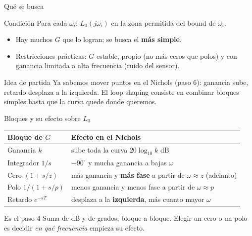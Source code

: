 \documentclass[aspectratio=169,11pt]{beamer}
\begin{document}
\begin{frame}{Qué se busca}
  \small
  \begin{block}{Condición}
    Para cada $\omega_i$: $L_0(j\omega_i)$ en la zona permitida del bound de $\omega_i$.
  \end{block}
  \begin{itemize}
    \item Hay muchos $G$ que lo logran; se busca el \textbf{más simple}.
    \item Restricciones prácticas: $G$ estable, propio (no más ceros que polos) y con ganancia limitada a alta frecuencia (ruido del sensor).
  \end{itemize}
  \begin{alertblock}{Idea de partida}
    Ya sabemos mover puntos en el Nichols (paso 6): ganancia sube, retardo desplaza a la izquierda. El loop shaping consiste en combinar bloques simples hasta que la curva quede donde queremos.
  \end{alertblock}
\end{frame}

\begin{frame}{Bloques y su efecto sobre $L_0$}
  \small
  \begin{center}
  \begin{tabular}{l|l}
    \textbf{Bloque de $G$} & \textbf{Efecto en el Nichols}\\\hline
    Ganancia $k$ & sube toda la curva $20\log_{10}k$ dB\\[2pt]
    Integrador $1/s$ & $-90^\circ$ y mucha ganancia a bajas $\omega$\\[2pt]
    Cero $(1+s/z)$ & más ganancia y \textbf{más fase} a partir de $\omega\approx z$ (adelanto)\\[2pt]
    Polo $1/(1+s/p)$ & menos ganancia y menos fase a partir de $\omega\approx p$\\[2pt]
    Retardo $e^{-sT}$ & desplaza a la \textbf{izquierda}, más cuanto mayor $\omega$
  \end{tabular}
  \end{center}
  \begin{block}{Es el paso 4}
    Suma de dB y de grados, bloque a bloque. Elegir un cero o un polo es decidir \emph{en qué frecuencia} empieza su efecto.
  \end{block}
\end{frame}
\end{document}
